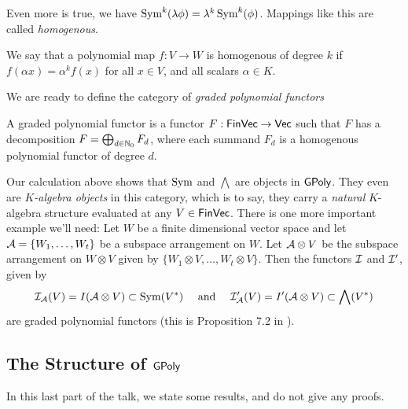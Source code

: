 \documentclass[../main.tex]{subfiles}
\begin{document}
Even more is true, we have $\operatorname{Sym}^k(\lambda \phi) = \lambda^k \operatorname{Sym}^k(\phi)$. 
Mappings like this are called \emph{homogenous}.
\begin{defi}
    We say that a polynomial map $f: V \to W$ is homogenous of degree $k$ if
    $f(\alpha x) = \alpha^k f(x)$ for all $x \in V$, and all scalars $\alpha \in K$.
\end{defi}

We are ready to define the category of \emph{graded polynomial functors}

\begin{defi}
    A graded polynomial functor is a functor $F: \textnormal{$\textsf{FinVec}$} \to \textnormal{$\textsf{Vec}$}$ such that 
    $F$ has a decomposition $F = \bigoplus_{d \in \mathbb{N}_0} F_d$, where 
    each summand $F_d$ is a homogenous polynomial functor of degree $d$.
\end{defi}

Our calculation above shows that $\operatorname{Sym}$ and $\bigwedge$ are objects in $\textnormal{$\textsf{GPoly}$}$. 
They even are \emph{$K$-algebra objects} in this category, which is to say, they 
carry a \emph{natural} $K$-algebra structure evaluated at any $V \in \textnormal{$\textsf{FinVec}$}$.
There is one more important example we'll need: Let $W$ be a finite dimensional vector
space and let $\mathcal{A} = \{W_1,\dots, W_t\}$ be a subspace arrangement on $W$. Let
$\mathcal{A} \otimes V$ be the subspace arrangement on $W \otimes V$ given by 
$\{W_1 \otimes V, \dots, W_t \otimes V\}$. Then the functors $\mathcal{I}$ and $\mathcal{I}'$, given by
\begin{equation*}
    \mathcal{I}_{\mathcal{A}}(V) = I(\mathcal{A} \otimes V) \subset \operatorname{Sym}(V^*) \quad \text{ and } \quad
    \mathcal{I}'_{\mathcal{A}}(V) = I'(\mathcal{A} \otimes V) \subset \bigwedge(V^*)
\end{equation*}
are graded polynomial functors (this is Proposition 7.2 in 
\cite{Gandini2019ResOfIdeals}). 

\subsection{The Structure of $\textnormal{$\textsf{GPoly}$}$}
In this last part of the talk, we state some results, and do not give any proofs.
\end{document}
